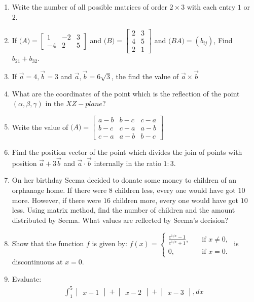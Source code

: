 \documentclass[12pt,-letter paper]{article}
\let\vec\mathbf{}
\let\vec\mathbf{}
\let\vec\mathbf{}
\providecommand{\mydet}[1]{\ensuremath{\begin{vmatrix}#1\end{vmatrix}}}
\providecommand{\myvec}[1]{\ensuremath{\begin{bmatrix}#1\end{bmatrix}}}
\providecommand{\brak}[1]{\ensuremath{\left(#1\right)}}
\begin{document}
\begin{enumerate}
\item Write the number of all possible matrices of order $2 \times 3$ with each entry  $1$ or $2$.
\item If $\vec(A)=\myvec{1 & -2 & 3 \\ -4 & 2 & 5 }$ and $\vec(B)=\myvec{2 & 3  \\ 4 & 5 \\ 2 & 1}$ and $\vec(BA)=(b_{ij})$, Find $b_{21}+b_{32}$.
\item If $\overset{\rightarrow}{a}=4,\overset{\rightarrow}{b}=3$ and $\overset{\rightarrow}{a},\overset{\rightarrow}{b}=6\sqrt{3}$, the find the value of $\overset{\rightarrow}{a}\times\overset{\rightarrow}{b}$

\item What are the coordinates of the point which is the reflection of the point $\brak{\alpha, \beta, \gamma}$ in the $XZ-plane$?
\item Write the value of $\vec(A)=\myvec{a-b & b-c & c-a \\ b-c & c-a & a-b \\ c-a & a-b & b-c}$

\item Find the position vector of the point which divides the join of points with position $\overset{\rightarrow}{a}+3\overset{\rightarrow}{b}$ and $\overset{\rightarrow}{a} \cdot \overset{\rightarrow}{b}$ internally in the ratio $1: 3$.

\item  On her birthday Seema decided to donate some money to children of an orphanage home. If there were $8$ children less, every one would have got \rupee$10$ more. However, if there were $16$ children more, every one would have got \rupee$10$ less. Using matrix method, find the number of children and the amount distributed by Seema. What values are reflected by Seema's decision?
\item Show that the function $f$ is given by:
$
f(x) =
\begin{cases}
    \frac{e^{1/x} - 1}{e^{1/x} + 1}, & \quad \text{if } x \neq 0, \\  
    0, & \quad \text{if } x = 0.
  \end{cases}
$
 is discontinuous at $x = 0$.  

\item Evaluate: 
	\begin{align*}
		\int_1^5 \mydet{x - 1} + \mydet{x - 2} + \mydet{x - 3} , dx
	\end{align*}


\end{enumerate}
\end{document}

